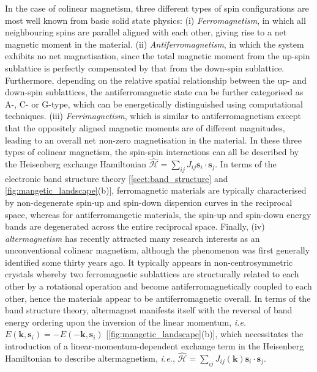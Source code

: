 In the case of colinear magnetism, three different types of spin configurations are most well known from basic solid state physics:\cite{kittel2018introduction} (i) \textit{Ferromagnetism}, in which all neighbouring spins are parallel aligned with each other, giving rise to a net magnetic moment in the material. (ii) \textit{Antiferromagnetism}, in which the system exhibits no net magnetisation, since the total magnetic moment from the up-spin sublattice is perfectly compensated by that from the down-spin sublattice. Furthermore, depending on the relative spatial relationship between the up- and down-spin sublattices, the antiferromagnetic state can be further categorised as A-, C- or G-type, which can be energetically distinguished using computational techniques.\cite{horton2019high,chang2021electronic,kassimi2023electronic} (iii) \textit{Ferrimagnetism}, which is similar to antiferromagnetism except that the oppositely aligned magnetic moments are of different magnitudes, leading to an overall net non-zero magnetisation in the material. In  these three types of colinear magnetism, the spin-spin interactions can all be described by the Heisenberg exchange Hamiltonian $\hat{\mathcal{H}}=\sum_{ij}J_{ij}\bm{s}_i\cdot\bm{s}_j$. In terms of the electronic band structure theory [\cref{sect:band_structure} and \cref{fig:mangetic_landscape}(b)], ferromagnetic materials are typically characterised by non-degenerate spin-up and spin-down dispersion curves in the reciprocal space, whereas for antiferromangetic materials, the spin-up and spin-down energy bands are degenerated across the entire reciprocal space. Finally, (iv) \textit{altermagnetism} has recently attracted\cite{vsmejkal2022beyond,fender2025altermagnetism} many research interests as an unconventional colinear magnetism, although the phenomenon was first generally identified some thirty years ago.\cite{solovyev1997magneto} It typically appears in non-centrosymmetric crystals whereby two ferromagnetic sublattices are structurally related to each other by a rotational operation and become antiferromagnetically coupled to each other, hence the materials appear to be antiferromagnetic overall. In terms of the band structure theory, altermagnet manifests itself with the reversal of band energy ordering upon the inversion of the linear momentum, \textit{i.e.} $E(\bm{k},\bm{s}_i)=-E(-\bm{k},\bm{s}_i)$ [\cref{fig:mangetic_landscape}(b)], which necessitates the introduction of a linear-momentum-dependent exchange term in the Heisenberg Hamiltonian to describe altermagnetism, \textit{i.e.}, $\hat{\mathcal{H}}=\sum_{ij}J_{ij}(\bm{k})\bm{s}_i\cdot\bm{s}_j$.

